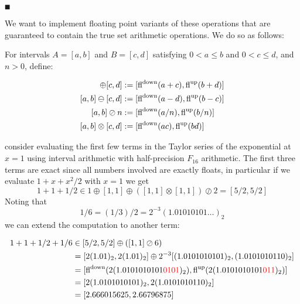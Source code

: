 \ensuremath{\QED}

We want to  implement floating point variants of these operations that are guaranteed to contain the true set arithmetic operations. We do so as follows:

\begin{definition} For intervals  $A = [a,b]$ and $B = [c,d]$ satisfying $0 < a \ensuremath{\leq} b$ and $0 < c \ensuremath{\leq} d$, and $n > 0$, define:


\begin{align*}
[a,b] \ensuremath{\oplus} [c,d] &:= [{\rm fl}^{\rm down}(a+c), {\rm fl}^{\rm up}(b+d)] \\
[a,b] \ensuremath{\ominus} [c,d] &:= [{\rm fl}^{\rm down}(a-d), {\rm fl}^{\rm up}(b-c)] \\
[a,b] \ensuremath{\oslash} n &:= [{\rm fl}^{\rm down}(a/n), {\rm fl}^{\rm up}(b/n)] \\
[a,b] \ensuremath{\otimes} [c,d] &:= [{\rm fl}^{\rm down}(ac), {\rm fl}^{\rm up}(bd)]
\end{align*}
\end{definition}

\begin{example} consider evaluating the first few terms in the Taylor series of the exponential at $x = 1$ using interval arithmetic with half-precision $F_{16}$ arithmetic.  The first three terms are exact since all numbers involved are exactly floats, in particular if we evaluate $1 + x + x^2/2$ with $x = 1$ we get
\[
1 + 1 + 1/2 \ensuremath{\in} 1 \ensuremath{\oplus} [1,1] \ensuremath{\oplus} ([1,1] \ensuremath{\otimes} [1,1]) \ensuremath{\oslash} 2 = [5/2, 5/2]
\]
Noting that 
\[
1/6 = (1/3)/2 = 2^{-3} (1.01010101\ensuremath{\ldots})_2
\]
we can extend the computation to another term:


\begin{align*}
1 + 1 + 1/2 + 1/6 &\ensuremath{\in} [5/2,5/2] \ensuremath{\oplus} ([1,1] \ensuremath{\oslash} 6) \ccr
= [2 (1.01)_2, 2 (1.01)_2] \ensuremath{\oplus} 2^{-3}[(1.0101010101)_2, (1.0101010110)_2] \ccr
= [{\rm fl}^{\rm down}(2 (1.0101010101\red{0101})_2), {\rm fl}^{\rm up}(2 (1.0101010101\red{011})_2)] \ccr
= [2(1.0101010101)_2, 2(1.0101010110)_2] \ccr 
= [2.666015625, 2.66796875]
\end{align*}
\end{example}


